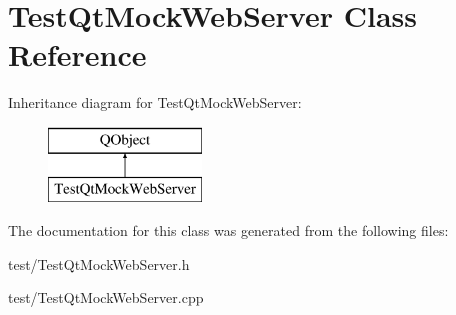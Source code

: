 \hypertarget{class_test_qt_mock_web_server}{\section{Test\+Qt\+Mock\+Web\+Server Class Reference}
\label{class_test_qt_mock_web_server}
}
Inheritance diagram for Test\+Qt\+Mock\+Web\+Server\+:\begin{figure}[H]
\begin{center}
\leavevmode
\includegraphics[height=2.000000cm]{class_test_qt_mock_web_server}
\end{center}
\end{figure}


The documentation for this class was generated from the following files\+:\begin{DoxyCompactItemize}
\item 
test/Test\+Qt\+Mock\+Web\+Server.\+h\item 
test/Test\+Qt\+Mock\+Web\+Server.\+cpp\end{DoxyCompactItemize}
